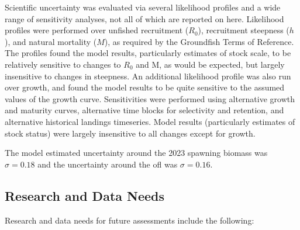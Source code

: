 \documentclass[11pt,
  english,
  letterpaper,
]{article}
\begin{document}
Scientific uncertainty was evaluated via several likelihood profiles and a wide range of sensitivity analyses, not all of which are reported on here. Likelihood profiles were performed over unfished recruitment (\(R_0\)), recruitment steepness (\(h\)), and natural mortality (\(M\)), as required by the Groundfish Terms of Reference. The profiles found the model results, particularly estimates of stock scale, to be relatively sensitive to changes to \(R_0\) and M, as would be expected, but largely insensitive to changes in steepness. An additional likelihood profile was also run over growth, and found the model results to be quite sensitive to the assumed values of the growth curve. Sensitivities were performed using alternative growth and maturity curves, alternative time blocks for selectivity and retention, and alternative historical landings timeseries. Model results (particularly estimates of stock status) were largely insensitive to all changes except for growth.

The model estimated uncertainty around the 2023 spawning biomass was \(\sigma = 0.18\) and the uncertainty around the \gls{ofl} was \(\sigma = 0.16\).

\hypertarget{research-and-data-needs-1}{%
\subsection{Research and Data Needs}\label{research-and-data-needs-1}}

Research and data needs for future assessments include the following:
\end{document}
